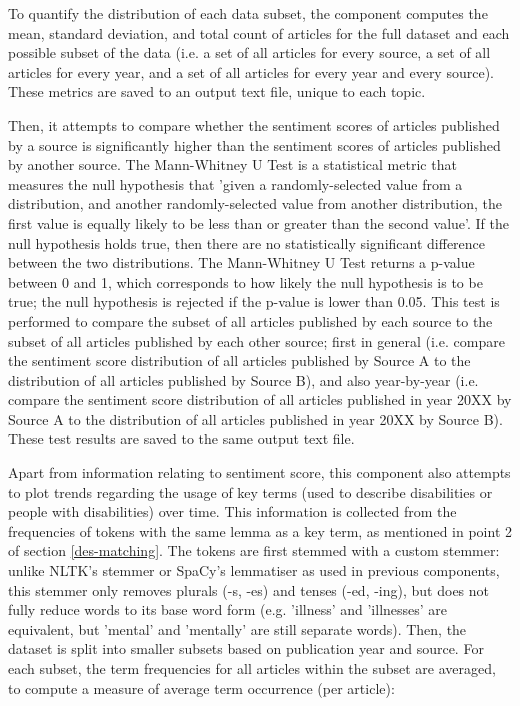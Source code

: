 \documentclass{report}
\begin{document}
To quantify the distribution of each data subset, the component computes the mean, standard deviation, and total count of articles for the full dataset and each possible subset of the data (i.e. a set of all articles for every source, a set of all articles for every year, and a set of all articles for every year and every source). 
These metrics are saved to an output text file, unique to each topic.

Then, it attempts to compare whether the sentiment scores of articles published by a source is significantly higher than the sentiment scores of articles published by another source. 
The Mann-Whitney U Test \cite{mann1947test} is a statistical metric that measures the null hypothesis that 'given a randomly-selected value from a distribution, and another randomly-selected value from another distribution, the first value is equally likely to be less than or greater than the second value'.
If the null hypothesis holds true, then there are no statistically significant difference between the two distributions.
The Mann-Whitney U Test returns a p-value between 0 and 1, which corresponds to how likely the null hypothesis is to be true; the null hypothesis is rejected if the p-value is lower than 0.05.
This test is performed to compare the subset of all articles published by each source to the subset of all articles published by each other source; first in general (i.e. compare the sentiment score distribution of all articles published by Source A to the distribution of all articles published by Source B), and also year-by-year (i.e. compare the sentiment score distribution of all articles published in year 20XX by Source A to the distribution of all articles published in year 20XX by Source B). These test results are saved to the same output text file.

Apart from information relating to sentiment score, this component also attempts to plot trends regarding the usage of key terms (used to describe disabilities or people with disabilities) over time.
This information is collected from the frequencies of tokens with the same lemma as a key term, as mentioned in point 2 of section \ref{des-matching}.
The tokens are first stemmed with a custom stemmer: unlike NLTK's stemmer or SpaCy's lemmatiser as used in previous components, this stemmer only removes plurals (-s, -es) and tenses (-ed, -ing), but does not fully reduce words to its base word form (e.g. 'illness' and 'illnesses' are equivalent, but 'mental' and 'mentally' are still separate words).
Then, the dataset is split into smaller subsets based on publication year and source.
For each subset, the term frequencies for all articles within the subset are averaged, to compute a measure of average term occurrence (per article):
\end{document}
